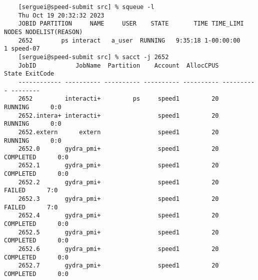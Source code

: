 \small
\begin{verbatim}
	[serguei@speed-submit src] % squeue -l
	Thu Oct 19 20:32:32 2023
	JOBID PARTITION     NAME     USER    STATE       TIME TIME_LIMI  NODES NODELIST(REASON)
	2652        ps interact   a_user  RUNNING   9:35:18 1-00:00:00      1 speed-07
	[serguei@speed-submit src] % sacct -j 2652
	JobID           JobName  Partition    Account  AllocCPUS      State ExitCode
	------------ ---------- ---------- ---------- ---------- ---------- --------
	2652         interacti+         ps     speed1         20    RUNNING      0:0
	2652.intera+ interacti+                speed1         20    RUNNING      0:0
	2652.extern      extern                speed1         20    RUNNING      0:0
	2652.0       gydra_pmi+                speed1         20  COMPLETED      0:0
	2652.1       gydra_pmi+                speed1         20  COMPLETED      0:0
	2652.2       gydra_pmi+                speed1         20     FAILED      7:0
	2652.3       gydra_pmi+                speed1         20     FAILED      7:0
	2652.4       gydra_pmi+                speed1         20  COMPLETED      0:0
	2652.5       gydra_pmi+                speed1         20  COMPLETED      0:0
	2652.6       gydra_pmi+                speed1         20  COMPLETED      0:0
	2652.7       gydra_pmi+                speed1         20  COMPLETED      0:0
\end{verbatim}
\normalsize